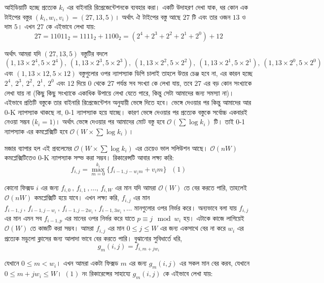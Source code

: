 আইডিয়াটি হচ্ছে প্রত্যেক \(k_{i}\) এর বাইনারি রিপ্রেজেন্টেশনকে ব্যবহার করা। একটি উদাহরণ দেখা যাক, ধর কোন এক টাইপের বস্তুর \((k_{i}, w_{i}, v_{i}) = (27, 13, 5)\)।  অর্থাৎ ঐ টাইপের বস্তু আছে \(27\) টি এবং তার ওজন \(13\) ও দাম \(5\)। এখন \(27\) কে এইভাবে লেখা যায়: \[27 = 11011_{2} = 1111_{2} + 1100_{2} = (2^{4} + 2^{3} + 2^{2} + 2^{1} + 2^{0}) + 12\]

অর্থাৎ আমরা যদি \((27, 13, 5)\) বস্তুটির বদলে \((1, 13 \times 2^{4}, 5 \times 2^{4}), \ (1, 13 \times 2^{3}, 5 \times 2^{3}), \ (1, 13 \times 2^{2}, 5 \times 2^{2}), \ (1, 13 \times 2^{1}, 5 \times 2^{1}), \ (1, 13 \times 2^{0}, 5 \times 2^{0})\) এবং \((1, 13 \times 12, 5 \times 12)\) বস্তুগুলোর ওপর ন্যাপস্যাক ডিপি চালাই তাহলে উত্তর চেঞ্জ হবে না, এর কারন হচ্ছে \(2^{4}, \ 2^{3}, \ 2^{2}, \ 2^{1}, \ 2^{0}\) এবং \(12\) দিয়ে  \(0\) থেকে \(27\) পর্যন্ত সব সংখ্যা কে লেখা যায়, তবে $27$ এর বড় কোন সংখ্যাকে লেখা যায় না (কিছু কিছু সংখ্যাকে একাধিক উপায়ে লেখা যেতে পারে, কিন্তু সেটা আমাদের জন্য সমস্যা না)। এইভাবে প্রতিটি বস্তুকে তার বাইনারি রিপ্রেজেন্টেশন অনুযায়ী ভেঙ্গে দিতে হবে। ভেঙ্গে দেওয়ার পর কিন্তু আমাদের আর 0-K ন্যাপস্যাক থাকছে না, 0-1 ন্যাপস্যাক হয়ে যাচ্ছে। কারণ ভেঙ্গে দেওয়ার পর প্রত্যেক বস্তুকে সর্বোচ্চ একবারই নেওয়া সম্ভব (\(k_{i} = 1)\)।  অর্থাৎ ভেঙ্গে দেওয়ার পর আমাদের মোট বস্তু হবে \(\mathcal{O}(\sum \log k_{i})\) টি। তাই 0-1 ন্যাপস্যাক এর কমপ্লেক্সিটি হবে \(\mathcal{O}(W \times \sum \log k_{i})\)। 

মজার ব্যাপার হল এই প্রবলেমের \(\mathcal{O}(W \times \sum \log k_{i})\) এর চেয়েও ভাল সলিউশন আছে। \(\mathcal{O}(nW)\) কমপ্লেক্সিটিতেও 0-K ন্যাপস্যাক সল্ভ করা সম্ভব। রিকারেন্সটি আবার লক্ষ্য করি: \\
\[f_{i, j} = \max_{m = 0}^{k_{i}} \lbrace f_{i - 1, j - w_{i}m} + v_{i}m \rbrace \ \ \ (1)\]

কোনো ফিক্সড \(i\) এর জন্য \(f_{i, 0} \, , \, f_{i, 1} \, , \dots, \, f_{i, W}\) এর মান যদি আমরা \(\mathcal{O}(W)\) তে বের করতে পারি, তাহলেই \(\mathcal{O}(nW)\) কমপ্লেক্সিটি হয়ে যাবে। এখন লক্ষ্য করি, \(f_{i, j}\) এর মান \(f_{i - 1, j} \, , \, f_{i - 1, j - w_{i}} \, , \, f_{i - 1, j - 2w_{i}} \, , \, f_{i - 1, 3w_{i}} \, , \dots\) মানগুলোর ওপর নির্ভর করে। অন্যভাবে বলা যায় \(f_{i, j}\) এর মান এমন সব \(f_{i - 1, p}\) এর মানের ওপর নির্ভর করে যাতে \(p \equiv j \mod w_{i}\) হয়।  এটাকে কাজে লাগিয়েই \(\mathcal{O}(W)\) তে কাজটি করা সম্ভব। আমরা \(f_{i, j}\) এর মান \(0 \leq j \leq W\) এর জন্য একসাথে বের না করে \(w_{i}\) এর প্রত্যেক মডুলো ক্লাসের জন্য আলাদা ভাবে বের করতে পারি।  বুঝানোর  সুবিধার্তে ধরি, 
\[g_{m}(i, j) = f_{i, m + jw_{i}}\]
 
যেখানে \(0 \leq m < w_{i}\)। এখন আমরা একটা ফিক্সড \(m\) এর জন্য \(g_{m}(i, j)\) এর সকল মান বের করব, যেখানে \(0 \leq m + jw_{i} \leq W\)।  \((1)\) নং রিকারেন্সের সাহায্যে \(g_{m}(i, j)\) কে এইভাবে লেখা যায়: 

